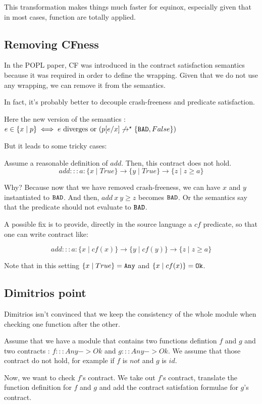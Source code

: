 \documentclass{article}
\begin{document}
This transformation makes things much faster for equinox, especially
given that in most cases, function are totally applied.

\subsection{Removing CFness}
In the POPL paper, CF was introduced in the contract satisfaction
semantics because it was required in order to define the
wrapping. Given that we do not use any wrapping, we can remove it from
the semantics.

In fact, it's probably better to decouple crash-freeness and predicate
satisfaction.

Here the new version of the semantics : $e \in \{x \mid p \} \iff e
\mbox{ diverges or } (p[e/x] \not \to^\star \{\texttt{BAD},False\})$


But it leads to some tricky cases:

Assume a reasonable definition of $add$. Then, this contract does not
hold.
$$add ::: a:\{ x \mid True \} \to \{ y \mid True \} \to \{ z \mid z
\geq a \}$$

Why? Because now that we have removed crash-freeness, we can have $x$
and $y$ instantiated to $\texttt{BAD}$. And then, $ add~x~y \geq z $ becomes
$\texttt{BAD}$. Or the semantics say that the predicate should not evaluate to
$\texttt{BAD}$. 

A possible fix is to provide, directly in the source language a $cf$
predicate, so that one can write contract like:

$$add ::: a:\{ x \mid cf(x) \} \to \{ y \mid cf(y) \} \to \{ z \mid z
\geq a \}$$

Note that in this setting $\{ x \mid True \} = \texttt{Any}$ and $\{ x \mid
cf(x) \} = \texttt{Ok}$.

\subsection{Dimitrios point}
Dimitrios isn't convinced that we keep the consistency of the whole
module when checking one function after the other.

Assume that we have a module that contains two functions defintion $f$
and $g$ and two contracts : $f ::: Any -> Ok$ and $g ::: Any ->
Ok$. We assume that those contract do not hold, for example if $f$ is
$not$ and $g$ is $id$.

Now, we want to check $f$'s contract. We take out $f$'s contract,
translate the function definition for $f$ and $g$ and add the contract
satisfation formulae for $g$'s contract.
\end{document}
